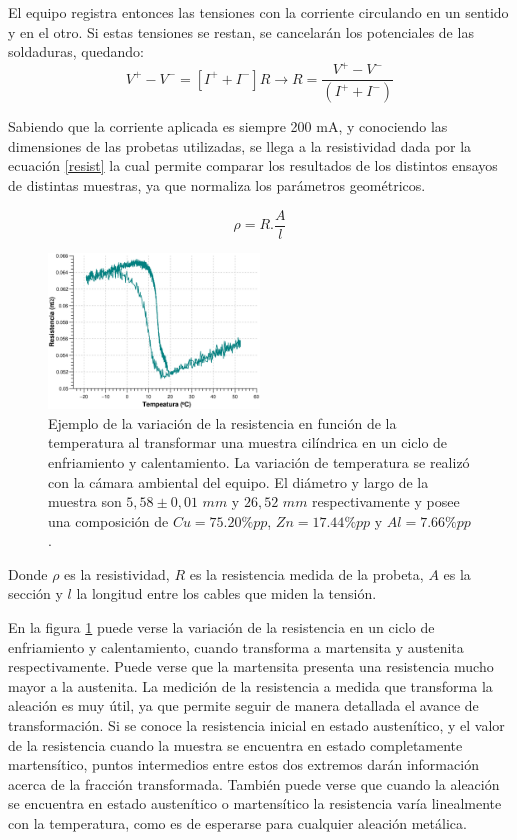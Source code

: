 \documentclass[a4paper,12pt,fleqn,twoside,openany]{book}
\begin{document}
El equipo registra entonces las tensiones con la corriente circulando en un sentido y en el otro. Si estas tensiones se restan, se cancelarán los potenciales 
de las soldaduras, quedando:  
\begin{equation}
 V^+ - V^-= [I^+ + I^-] R \longrightarrow R=\frac{V^+ - V^-}{(I^+ + I^-)}
\end{equation}


Sabiendo que la corriente aplicada es siempre 200 mA, y conociendo las dimensiones de las probetas utilizadas, se llega a la resistividad dada por la 
ecuación \ref{resist} la cual permite comparar los resultados de los distintos ensayos de distintas muestras, ya que normaliza los parámetros geométricos.

\begin{equation}
 \rho = R . \frac{A}{l} \label{resist} 
\end{equation}

\begin{figure}
 \centering
 \includegraphics[width=0.5\textwidth]{Img/Resultados/RvsTClavo5.eps}
 \caption{Ejemplo de la variación de la resistencia en función de la temperatura al transformar una muestra cilíndrica en un ciclo de enfriamiento y calentamiento. La variación de temperatura se realizó con la cámara ambiental del equipo. El diámetro y largo de la muestra son $5,58\pm0,01$ $mm$ y $26,52$ $mm$ respectivamente y posee una composición de $Cu=75.20 \% pp$, $Zn= 17.44 \% pp$ y $Al=7.66 \%pp $.} 
 \label{fig:RvsTClavo5}
 \end{figure}


Donde $\rho$ es la resistividad, $R$ es la resistencia medida de la probeta, $A$ es la sección y $l$ la longitud entre los cables que miden la tensión.
 
En la figura \ref{fig:RvsTClavo5} puede verse la variación de la resistencia en un ciclo de enfriamiento y calentamiento, cuando transforma a martensita y austenita respectivamente. Puede verse que la martensita presenta una resistencia mucho mayor a la austenita. La medición de la resistencia a medida que transforma la aleación es muy útil, ya que permite seguir 
de manera detallada el avance de transformación. Si se conoce la resistencia inicial en estado austenítico, y el valor de la resistencia cuando la 
muestra se encuentra en estado completamente martensítico, puntos intermedios entre estos dos extremos darán información acerca de la fracción transformada.
También puede verse que cuando la aleación se encuentra en estado austenítico o martensítico la resistencia varía linealmente con la temperatura, como es 
de esperarse para cualquier aleación metálica. 
\end{document}
